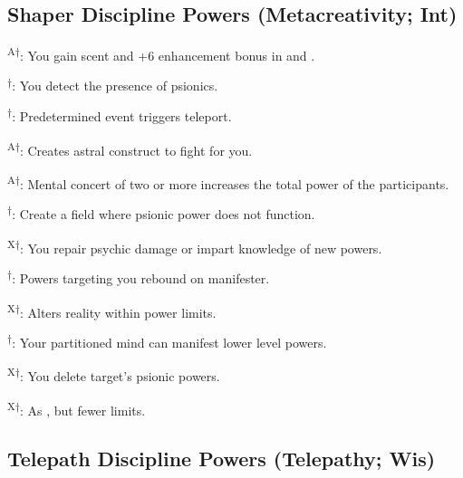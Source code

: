 \subsection{Shaper Discipline Powers {\normalsize(Metacreativity; Int)}}
\begin{enumerate*}
\item {}\textsuperscript{A$\dagger$}: You gain scent and +6 enhancement bonus in  and .

\item {}\textsuperscript{$\dagger$}: You detect the presence of psionics.

      \textsuperscript{$\dagger$}: Predetermined event triggers teleport.

\item
\item
\item {}\textsuperscript{A$\dagger$}: Creates astral construct to fight for you.

      \textsuperscript{A$\dagger$}: Mental concert of two or more increases the total power of the participants.

\item {}\textsuperscript{$\dagger$}: Create a field where psionic power does not function.
\item {}\textsuperscript{X$\dagger$}: You repair psychic damage or impart knowledge of new powers.

      \textsuperscript{$\dagger$}: Powers targeting you rebound on manifester.

\item {}\textsuperscript{X$\dagger$}: Alters reality within power limits.

      \textsuperscript{$\dagger$}: Your partitioned mind can manifest lower level powers.

\item {}\textsuperscript{X$\dagger$}: You delete target's psionic powers.

      \textsuperscript{X$\dagger$}: As , but fewer limits.
\end{enumerate*}



\subsection{Telepath Discipline Powers {\normalsize(Telepathy; Wis)}}
\begin{enumerate*}
\item
\item
\item
\item
\item
\item
\item
\item
\item
\end{enumerate*}